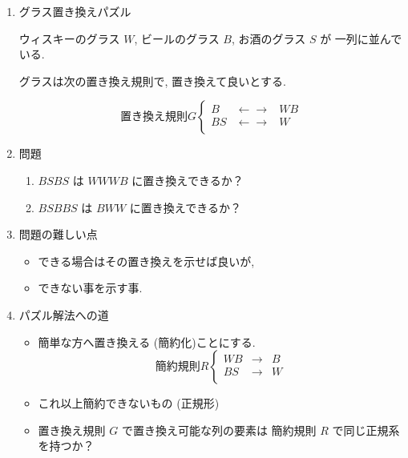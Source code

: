 \documentclass[a4j,12pt]{jarticle}
\begin{document}
\begin{enumerate}
\item グラス置き換えパズル
\label{sec:org1098bb3}

ウィスキーのグラス \(W\), ビールのグラス \(B\), お酒のグラス \(S\) が
一列に並んでいる.

グラスは次の置き換え規則で, 置き換えて良いとする.

$$置き換え規則 G \left\{ \begin{array}{rll}
B &  \leftarrow\rightarrow  &  W B\\
BS& \leftarrow\rightarrow   & W  \\
      \end{array}
\right.$$

\item 問題
\label{sec:orgb129d9c}

\begin{enumerate}
\item \(BSBS\) は \(WWWB\) に置き換えできるか？

\item \(BSBBS\) は \(BWW\) に置き換えできるか？
\end{enumerate}

\item 問題の難しい点
\label{sec:orgc2a6775}

\begin{itemize}
\item できる場合はその置き換えを示せば良いが,

\item できない事を示す事.
\end{itemize}

\item パズル解法への道
\label{sec:orgb6de9cb}

\begin{itemize}
\item 簡単な方へ置き換える (簡約化)ことにする.
$$簡約規則 R \left\{ \begin{array}{rll}
   WB & \rightarrow  &  B\\
   BS & \rightarrow   & W  \\
         \end{array}
   \right.$$

\item これ以上簡約できないもの (正規形)

\item 置き換え規則 \(G\) で置き換え可能な列の要素は 簡約規則 \(R\)
で同じ正規系を持つか？


\end{itemize}
\end{enumerate}
\end{document}

